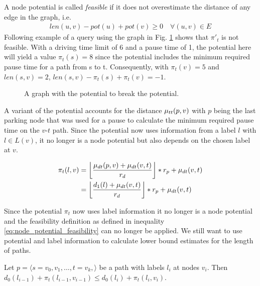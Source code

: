 A node potential is called \emph{feasible} if it does not overestimate the distance of any edge in the graph, i.e.
\begin{align}
	\label{eq:node_potential_feasibility}
	len(u,v) - pot(u) + pot(v) \ge 0 \quad \forall (u,v) \in E
\end{align}
Following example of a query using the graph in Fig. \ref{fig:graph_infeasible_potential} shows that $\pi{'}_t$ is not feasible. With a driving time limit of 6 and a pause time of 1, the potential here will yield a value $\pi_t(s) = 8$ since the potential includes the minimum required pause time for a path from s to t. Consequently, with $\pi_t(v) = 5$ and $len(s,v) = 2$, $len(s,v) - \pi_t(s) + \pi_t(v) = -1$.

\begin{figure}[hbtp]
	\centering
	
	\caption{A graph with the potential to break the potential.}
	\label{fig:graph_infeasible_potential}
\end{figure}

A variant of the potential accounts for the distance $\traveltime(p,v)$ with $p$ being the last parking node that was used for a pause to calculate the minimum required pause time on the $v$-$t$ path. Since the potential now uses information from a label $l$ with $l \in L(v)$, it no longer is a node potential but also depends on the chosen label at $v$.

\begin{align*}
	\pi_t(l,v) & = \floor*{ \frac{\drivingtime(p,v) + \drivingtime(v,t)}{\restr_d} } * \restr_p + \drivingtime(v,t) \\
	           & = \floor*{ \frac{d_1(l) + \drivingtime(v,t)}{\restr_d} } * \restr_p + \drivingtime(v,t)
\end{align*}

Since the potential $\pi_t$ now uses label information it no longer is a node potential and the feasibility definition as defined in inequality \ref{eq:node_potential_feasibility} can no longer be applied. We still want to use potential and label information to calculate lower bound estimates for the length of paths.

\begin{lemma}\label{lemma:pot_labels_get_larger}
	Let $p = \langle s=v_0,v_1,\ldots,t=v_k, \rangle$ be a path with labels $l_i$ at nodes $v_i$. Then $d_0(l_{i-1}) + \pi_t(l_{i-1},v_{i-1}) \le d_0(l_i) + \pi_t(l_i,v_i)$.
\end{lemma}

